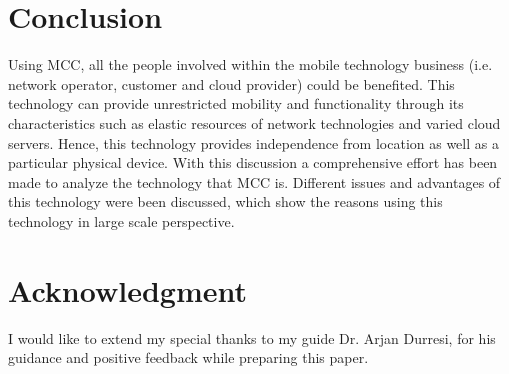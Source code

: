 \documentclass[10pt, conference, compsocconf]{IEEEtran}
\begin{document}



\section{Conclusion}
Using MCC, all the people involved within the mobile technology business (i.e. network operator, customer and cloud provider) could be benefited. This technology can provide unrestricted mobility and functionality through its characteristics such as elastic resources of network technologies and varied cloud servers.  Hence, this technology provides independence from location as well as a particular physical device. With this discussion a comprehensive effort has been made to analyze the technology that MCC is. Different issues and advantages of this technology were been discussed, which show the reasons using this technology in large scale perspective.



\section*{Acknowledgment}
I would like to extend my special thanks to my guide Dr. Arjan Durresi, for his guidance and positive feedback while preparing this paper.


\end{document}
